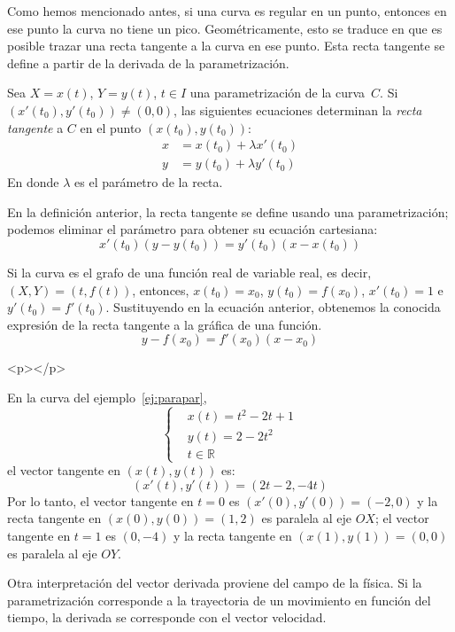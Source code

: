 Como hemos mencionado antes, si una curva es regular en un punto, entonces en ese punto la curva no tiene un pico. Geométricamente, esto se traduce en que es posible trazar una recta tangente a la curva en ese punto.
Esta recta tangente se define a partir de la derivada de la parametrización.
%
\begin{definicion} Sea $X=x(t)$, $Y=y(t)$, $t\in I$ una parametrización de la curva~$C$.
Si $(x'(t_0),y'(t_0))\ne(0,0)$, las siguientes ecuaciones determinan la \emph{recta tangente} a
$C$ en el punto $(x(t_0),y(t_0))$:
\begin{align*}
x & = x(t_0)+\lambda x'(t_0) \\
y & = y(t_0)+\lambda y'(t_0)
\end{align*}
En donde $\lambda$ es el parámetro de la recta.
\end{definicion}
%
En la definición anterior, la recta tangente se define usando una parametrización; podemos eliminar el parámetro para obtener su ecuación cartesiana:
\[
x'(t_0)(y-y(t_0))=y'(t_0)(x-x(t_0))
\]
%
\begin{ejemplo}
Si la curva es el grafo de una función real de variable real, es decir, $(X,Y)=(t,f(t))$, entonces, $x(t_0)=x_0$, $y(t_0)=f(x_0)$, $x'(t_0)=1$ e $y'(t_0)=f'(t_0)$. Sustituyendo en la ecuación anterior, obtenemos la conocida expresión de la recta tangente a la gráfica de una función.
\begin{equation}
y-f(x_0)=f'(x_0)(x-x_0)\tag*{\fej}
\end{equation}
\end{ejemplo}
\begin{rawhtml}
<p></p>
\end{rawhtml}
\begin{ejemplo}
En la curva del ejemplo~\ref{ej:parapar},
\[
\begin{cases}
& x(t)=t^2-2t+1\\
& y(t)=2-2t^2\\
& t\in\mathbb{R}
\end{cases}
\]
el vector tangente en $(x(t),y(t))$ es:
\[
(x'(t),y'(t))=(2t-2,-4t)
\]
Por lo tanto, el vector tangente en $t=0$ es $(x'(0),y'(0))=(-2,0)$ y la recta tangente en $(x(0),y(0))=(1,2)$ es paralela al eje $OX$;
el vector tangente en $t=1$ es $(0,-4)$ y la recta tangente en $(x(1),y(1))=(0,0)$ es paralela al eje $OY$.\fej
\end{ejemplo}
%
Otra interpretación del vector derivada proviene del campo de la física.
Si la parametrización corresponde a la trayectoria de un movimiento en función del tiempo, la derivada se corresponde con el vector velocidad.

